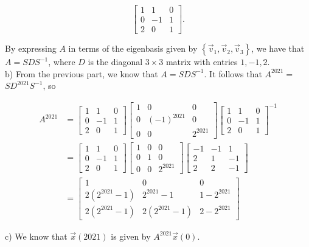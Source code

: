 \documentclass[10pt]{article}
\begin{document}
$$
\left[\begin{array}{ccc}
1 & 1 & 0 \\
0 & -1 & 1 \\
2 & 0 & 1
\end{array}\right] .
$$

By expressing $A$ in terms of the eigenbasis given by $\left\{\vec{v}_{1}, \vec{v}_{2}, \vec{v}_{3}\right\}$, we have that $A=S D S^{-1}$, where $D$ is the diagonal $3 \times 3$ matrix with entries $1,-1,2$.\\
b) From the previous part, we know that $A=S D S^{-1}$. It follows that $A^{2021}=$ $S D^{2021} S^{-1}$, so

$$
\begin{aligned}
A^{2021} & =\left[\begin{array}{ccc}
1 & 1 & 0 \\
0 & -1 & 1 \\
2 & 0 & 1
\end{array}\right]\left[\begin{array}{ccc}
1 & 0 & 0 \\
0 & (-1)^{2021} & 0 \\
0 & 0 & 2^{2021}
\end{array}\right]\left[\begin{array}{ccc}
1 & 1 & 0 \\
0 & -1 & 1 \\
2 & 0 & 1
\end{array}\right]^{-1} \\
& =\left[\begin{array}{ccc}
1 & 1 & 0 \\
0 & -1 & 1 \\
2 & 0 & 1
\end{array}\right]\left[\begin{array}{ccc}
1 & 0 & 0 \\
0 & 1 & 0 \\
0 & 0 & 2^{2021}
\end{array}\right]\left[\begin{array}{ccc}
-1 & -1 & 1 \\
2 & 1 & -1 \\
2 & 2 & -1
\end{array}\right] \\
& =\left[\begin{array}{ccc}
1 & 0 & 0 \\
2\left(2^{2021}-1\right) & 2^{2021}-1 & 1-2^{2021} \\
2\left(2^{2021}-1\right) & 2\left(2^{2021}-1\right) & 2-2^{2021}
\end{array}\right]
\end{aligned}
$$

c) We know that $\vec{x}(2021)$ is given by $A^{2021} \vec{x}(0)$.
\end{document}

